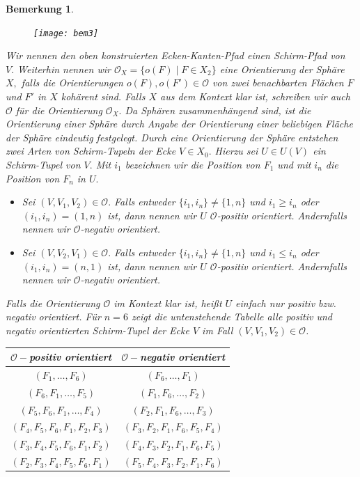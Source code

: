 \documentclass[12pt,titlepage,twoside,cleardoublepage]{article}
\theoremstyle{nummermitklammern}
\newtheorem{bemerkung}[temp]{Bemerkung}
\newtheorem{bemerkung}[zahl]{Bemerkung}
\numberwithin{equation}{section}
\begin{document}
\begin{bemerkung}
\begin{figure}[H]
\begin{center}
\texttt{[image: bem3]}
\end{center}
\end{figure}
Wir nennen den oben konstruierten Ecken-Kanten-Pfad einen \emph{Schirm-Pfad} von $V.$
Weiterhin nennen wir $\mathcal{O}_X=\{o(F)\mid F\in X_2\}$ eine Orientierung der Sphäre $X,$ falls die Orientierungen $o(F),o(F')\in \mathcal{O}$ von zwei benachbarten Flächen $F$ und $F'$ in $X$ kohärent sind. Falls $X$ aus dem Kontext klar ist, schreiben wir auch $\mathcal{O}$ für die Orientierung $\mathcal{O}_X.$ Da Sphären zusammenhängend sind, ist die  Orientierung einer Sphäre durch Angabe der Orientierung einer beliebigen Fläche der Sphäre eindeutig festgelegt. Durch eine Orientierung der Sphäre  entstehen zwei Arten von Schirm-Tupeln der Ecke $V\in X_0.$ Hierzu sei $U\in U(V)$ ein Schirm-Tupel von $V.$ Mit $i_1$ bezeichnen wir die Position von $F_1$ und mit $i_n$ die Position von $F_n$ in $U.$
\begin{itemize}
\item Sei
$(V,V_1,V_2)\in \mathcal{O}.$ Falls entweder $\{i_1,i_n\}\neq\{1,n\}$ und $i_1\geq i_n$ oder $(i_1,i_n)=(1,n)$ ist, dann nennen wir $U$ $\mathcal{O}$-positiv orientiert. Andernfalls nennen wir $\mathcal{O}$-negativ orientiert.
\item Sei $(V,V_2,V_1)\in \mathcal{O}.$ Falls entweder $\{i_1,i_n\}\neq \{1,n\}$ und $i_1\leq i_n$ oder $(i_1,i_n)=(n,1)$ ist, dann nennen wir $U$ $\mathcal{O}$-positiv orientiert. Andernfalls nennen wir  $\mathcal{O}$-negativ orientiert.
 \end{itemize}
Falls die Orientierung $\mathcal{O}$ im Kontext klar ist, heißt $U$ einfach nur positiv bzw. negativ orientiert.
Für $n=6$ zeigt die untenstehende Tabelle alle positiv und negativ orientierten Schirm-Tupel der Ecke $V$ im Fall $(V,V_1,V_2) \in \mathcal{O}$.\\
\begin{center}
\begin{tabular}{|c|c|}
\hline
$\mathcal{O}-$positiv orientiert & $\mathcal{O}-$negativ orientiert\\
\hline
$(F_1,\ldots,F_6)$&$(F_6,\ldots ,F_1)$\\
$(F_6,F_1,\ldots,F_5)$&$(F_1,F_6,\ldots ,F_2)$\\
$(F_5,F_6,F_1,\ldots,F_4)$&$(F_2,F_1,F_6,\ldots,F_3)$\\
$(F_4,F_5,F_6,F_1,F_2,F_3)$&$(F_3,F_2,F_1,F_6,F_5,F_4)$\\
$(F_3,F_4,F_5,F_6,F_1,F_2)$&$(F_4,F_3,F_2,F_1,F_6,F_5)$\\
$(F_2,F_3,F_4,F_5,F_6,F_1)$&$(F_5,F_4,F_3,F_2,F_1,F_6)$\\
\hline
\end{tabular}
\end{center}
\end{bemerkung}
  
\end{document}
